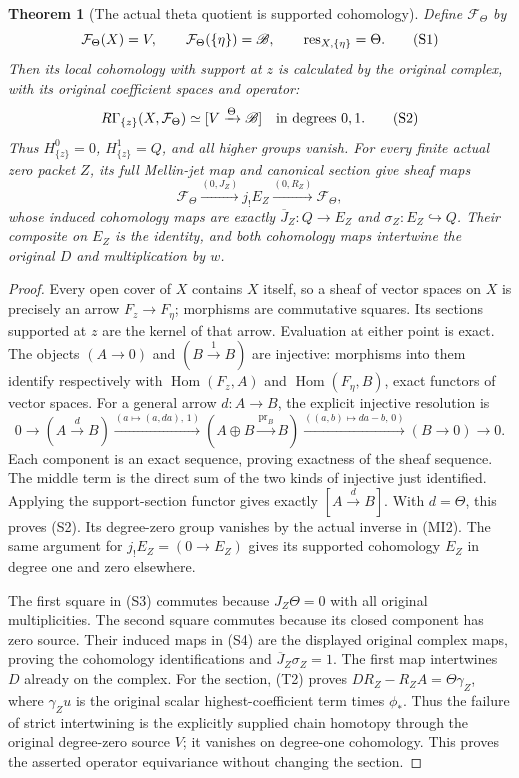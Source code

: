 \documentclass[11pt]{article}
\newtheorem{theorem}{Theorem}[section]
\begin{document}
\begin{theorem}[The actual theta quotient is supported cohomology]
Define $\mathcal F_\Theta$ by
\[
 \mathcal F_\Theta(X)=V,\qquad
 \mathcal F_\Theta(\{\eta\})=\mathscr B,\qquad
 \operatorname{res}_{X,\{\eta\}}=\Theta.
 \tag{S1}
\]
Then its local cohomology with support at $z$ is calculated by the
original complex, with its original coefficient spaces and operator:
\[
 R\Gamma_{\{z\}}(X,\mathcal F_\Theta)\simeq[V\xrightarrow{\Theta}\mathscr B]
       \quad\text{in degrees }0,1.
 \tag{S2}
\]
Thus $H^0_{\{z\}}=0$, $H^1_{\{z\}}=Q$, and all higher groups vanish.
For every finite actual zero packet $Z$, its full Mellin-jet map and
canonical section give sheaf maps
\[
 \mathcal F_\Theta\xrightarrow{(0,J_Z)} j_!E_Z
           \xrightarrow{(0,R_Z)}\mathcal F_\Theta,
 \tag{S3}
\]
whose induced cohomology maps are exactly
$\overline J_Z:Q\to E_Z$ and $\sigma_Z:E_Z\hookrightarrow Q$.
Their composite on $E_Z$ is the identity, and both cohomology maps
intertwine the original $D$ and multiplication by $w$.
\end{theorem}
\begin{proof}
Every open cover of $X$ contains $X$ itself, so a sheaf of vector
spaces on $X$ is precisely an arrow $F_z\to F_\eta$; morphisms
are commutative squares. Its sections supported at $z$ are the
kernel of that arrow. Evaluation at either point is exact. The
objects $(A\to0)$ and $(B\xrightarrow{1}B)$ are injective: morphisms
into them identify respectively with $\operatorname{Hom}(F_z,A)$
and $\operatorname{Hom}(F_\eta,B)$, exact functors of vector spaces.
For a general arrow $d:A\to B$, the explicit injective resolution is
\[
 0\to(A\xrightarrow d B)
 \xrightarrow{(a\mapsto(a,da),\,1)}
 (A\oplus B\xrightarrow{\mathrm{pr}_B}B)
 \xrightarrow{((a,b)\mapsto da-b,\,0)}(B\to0)\to0.
 \tag{S4}
\]
Each component is an exact sequence, proving exactness of the sheaf
sequence. The middle term is the direct sum of the two kinds of
injective just identified. Applying the support-section functor
gives exactly $[A\xrightarrow d B]$. With $d=\Theta$, this proves
(S2). Its degree-zero group vanishes by the actual inverse in (MI2).
The same argument for $j_!E_Z=(0\to E_Z)$ gives its supported
cohomology $E_Z$ in degree one and zero elsewhere.

The first square in (S3) commutes because $J_Z\Theta=0$ with all
original multiplicities. The second square commutes because its
closed component has zero source. Their induced maps in (S4) are
the displayed original complex maps, proving the cohomology
identifications and $\overline J_Z\sigma_Z=1$. The first map
intertwines $D$ already on the complex. For the section, (T2) proves
$DR_Z-R_ZA=\Theta\gamma_Z$, where $\gamma_Zu$ is the original
scalar highest-coefficient term times $\phi_*$. Thus the failure
of strict intertwining is the explicitly supplied chain homotopy
through the original degree-zero source $V$; it vanishes on degree-one
cohomology. This proves the asserted operator equivariance without
changing the section.
\end{proof}
\end{document}
